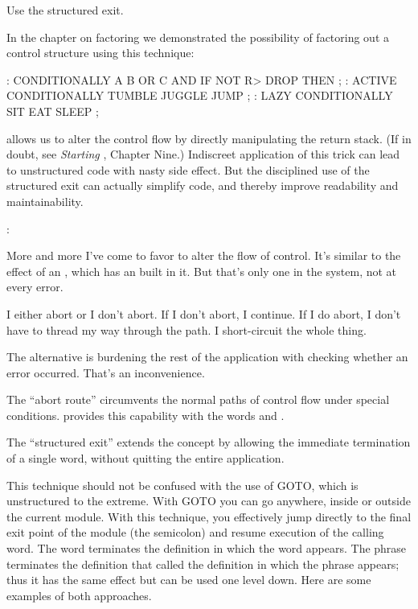 \begin{tip}
Use the structured exit.
\end{tip}
In the chapter on factoring we demonstrated the possibility of factoring
out a control structure using this technique:

\begin{Code}
: CONDITIONALLY   A B OR  C AND  IF  NOT R> DROP  THEN ;
: ACTIVE   CONDITIONALLY   TUMBLE JUGGLE JUMP ;
: LAZY   CONDITIONALLY  SIT  EAT  SLEEP ;
\end{Code}
\Forth{} allows us to alter the control flow by directly manipulating the
return stack. (If in doubt, see \emph{Starting \Forth{}}, Chapter Nine.)
Indiscreet application of this trick can lead to unstructured code with nasty
side effect. But the disciplined use of the structured exit can actually
simplify code, and thereby improve readability and maintainability.

\begin{interview}
:
\begin{tfquot}
More and more I've come to favor  to alter the flow of control.
It's similar to the effect of an , which has an 
built in it. But that's only one  in the system, not at every
error.

I either abort or I don't abort. If I don't abort, I continue. If I do abort, I
don't have to thread my way through the path. I short-circuit the whole
thing.

The alternative is burdening the rest of the application with checking
whether an error occurred. That's an inconvenience.
\end{tfquot}
\end{interview}
The ``abort route'' circumvents the normal paths of control flow under
special conditions. \Forth{} provides this capability with the words
 and .

The ``structured exit'' extends the concept by allowing the immediate
termination of a single word, without quitting the entire application.

This technique should not be confused with the use of GOTO, which
is unstructured to the extreme. With GOTO you can go anywhere, inside
or outside the current module. With this technique, you effectively jump
directly to the final exit point of the module (the semicolon) and resume
execution of the calling word.
%
The word  terminates the definition in which the word appears.
The phrase  terminates the definition that called the
definition in which the phrase appears; thus it has the same effect but can
be used one level down. Here are some examples of both approaches.


